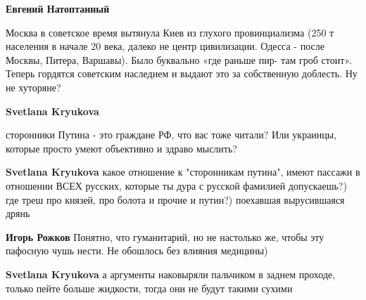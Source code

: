 \begin{itemize}
\begin{itemize}
\textbf{Евгений Натоптанный} 

Москва в советское время вытянула Киев из глухого провинциализма (250 т
населения в начале 20 века, далеко не центр цивилизации. Одесса - после Москвы,
Питера, Варшавы). Было буквально «где раньше пир- там гроб стоит». Теперь
гордятся советским наследием и выдают это за собственную доблесть. Ну не
хуторяне?


 
\textbf{Svetlana Kryukova} 

сторонники Путина - это граждане РФ, что вас тоже читали? Или украинцы, которые
просто умеют объективно и здраво мыслить?

 
\textbf{Svetlana Kryukova} какое отношение к "сторонникам путина", имеют пассажи в отношении ВСЕХ русских, которые ты дура с русской фамилией допускаешь?) где треш про князей, про болота и прочие и путин?) поехавшая вырусившаяся дрянь

 
\textbf{Игорь Рожков} Понятно, что гуманитарий, но не настолько же, чтобы эту пафосную чушь нести. Не обошлось без влияния медицины)

 
\textbf{Svetlana Kryukova} а аргументы наковыряли пальчиком в заднем проходе, только пейте больше жидкости, тогда они не будут такими сухими

 

\end{itemize}
\end{itemize}
